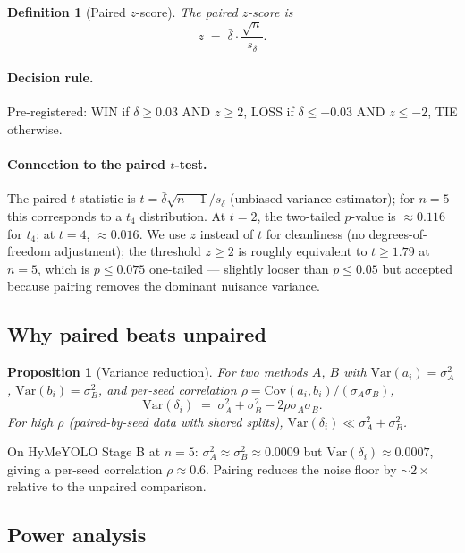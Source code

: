 \documentclass[11pt,a4paper]{article}
\newtheorem{definition}[theorem]{Definition}
\newtheorem{proposition}[theorem]{Proposition}
\theoremstyle{remark}
\newcommand{\Var}{\mathrm{Var}}
\newcommand{\Cov}{\mathrm{Cov}}
\begin{document}
\begin{definition}[Paired $z$-score]
The \emph{paired $z$-score} is
\[
  z \;=\; \bar\delta \cdot \frac{\sqrt n}{s_\delta}.
\]
\end{definition}

\paragraph{Decision rule.}
Pre-registered: WIN if $\bar\delta \geq 0.03$ AND $z \geq 2$,
LOSS if $\bar\delta \leq -0.03$ AND $z \leq -2$, TIE otherwise.

\paragraph{Connection to the paired $t$-test.}
The paired $t$-statistic is $t = \bar\delta \sqrt{n - 1} / s_\delta$
(unbiased variance estimator); for $n = 5$ this corresponds to a
$t_4$ distribution. At $t = 2$, the two-tailed $p$-value is
$\approx 0.116$ for $t_4$; at $t = 4$, $\approx 0.016$. We use
$z$ instead of $t$ for cleanliness (no degrees-of-freedom
adjustment); the threshold $z \geq 2$ is roughly equivalent to
$t \geq 1.79$ at $n = 5$, which is $p \leq 0.075$ one-tailed ---
slightly looser than $p \leq 0.05$ but accepted because pairing
removes the dominant nuisance variance.

\subsection{Why paired beats unpaired}

\begin{proposition}[Variance reduction]\label{prop:variance-reduction}
For two methods $A$, $B$ with $\Var(a_i) = \sigma_A^2$,
$\Var(b_i) = \sigma_B^2$, and per-seed correlation
$\rho = \Cov(a_i, b_i) / (\sigma_A \sigma_B)$,
\[
  \Var(\delta_i) \;=\; \sigma_A^2 + \sigma_B^2 - 2 \rho \sigma_A \sigma_B.
\]
For high $\rho$ (paired-by-seed data with shared splits),
$\Var(\delta_i) \ll \sigma_A^2 + \sigma_B^2$.
\end{proposition}

On HyMeYOLO Stage B at $n = 5$:
$\sigma_A^2 \approx \sigma_B^2 \approx 0.0009$ but $\Var(\delta_i)
\approx 0.0007$, giving a per-seed correlation $\rho \approx 0.6$.
Pairing reduces the noise floor by $\sim 2\times$ relative to the
unpaired comparison.

\subsection{Power analysis}
\end{document}
